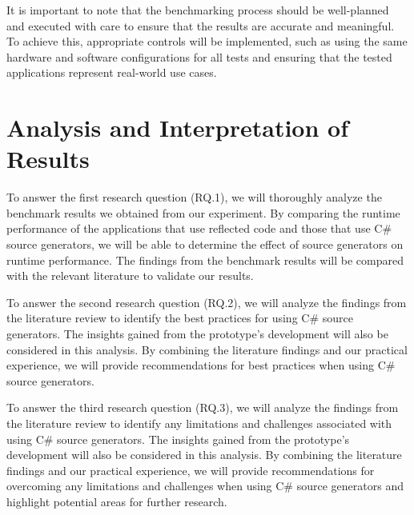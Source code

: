 It is important to note that the benchmarking process should be well-planned and executed with care to ensure that the results are accurate and meaningful. To achieve this, appropriate controls will be implemented, such as using the same hardware and software configurations for all tests and ensuring that the tested applications represent real-world use cases.


\section{Analysis and Interpretation of Results}

To answer the first research question (RQ.1), we will thoroughly analyze the benchmark results we obtained from our experiment. By comparing the runtime performance of the applications that use reflected code and those that use C\# source generators, we will be able to determine the effect of source generators on runtime performance. The findings from the benchmark results will be compared with the relevant literature to validate our results.

To answer the second research question (RQ.2), we will analyze the findings from the literature review to identify the best practices for using C\# source generators. The insights gained from the prototype's development will also be considered in this analysis. By combining the literature findings and our practical experience, we will provide recommendations for best practices when using C\# source generators.

To answer the third research question (RQ.3), we will analyze the findings from the literature review to identify any limitations and challenges associated with using C\# source generators. The insights gained from the prototype's development will also be considered in this analysis. By combining the literature findings and our practical experience, we will provide recommendations for overcoming any limitations and challenges when using C\# source generators and highlight potential areas for further research.

